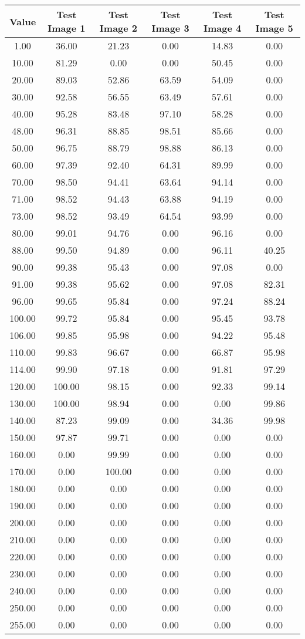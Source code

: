 \begin{tabular}{|c|c|c|c|c|c|}
\hline
\textbf{Value}&\textbf{Test Image 1}&\textbf{Test Image 2}&\textbf{Test Image 3}&\textbf{Test Image 4}&\textbf{Test Image 5}\\\hline
1.00&36.00&21.23&0.00&14.83&0.00\\\hline
10.00&81.29&0.00&0.00&50.45&0.00\\\hline
20.00&89.03&52.86&63.59&54.09&0.00\\\hline
30.00&92.58&56.55&63.49&57.61&0.00\\\hline
40.00&95.28&83.48&97.10&58.28&0.00\\\hline
48.00&96.31&88.85&98.51&85.66&0.00\\\hline
50.00&96.75&88.79&98.88&86.13&0.00\\\hline
60.00&97.39&92.40&64.31&89.99&0.00\\\hline
70.00&98.50&94.41&63.64&94.14&0.00\\\hline
71.00&98.52&94.43&63.88&94.19&0.00\\\hline
73.00&98.52&93.49&64.54&93.99&0.00\\\hline
80.00&99.01&94.76&0.00&96.16&0.00\\\hline
88.00&99.50&94.89&0.00&96.11&40.25\\\hline
90.00&99.38&95.43&0.00&97.08&0.00\\\hline
91.00&99.38&95.62&0.00&97.08&82.31\\\hline
96.00&99.65&95.84&0.00&97.24&88.24\\\hline
100.00&99.72&95.84&0.00&95.45&93.78\\\hline
106.00&99.85&95.98&0.00&94.22&95.48\\\hline
110.00&99.83&96.67&0.00&66.87&95.98\\\hline
114.00&99.90&97.18&0.00&91.81&97.29\\\hline
120.00&100.00&98.15&0.00&92.33&99.14\\\hline
130.00&100.00&98.94&0.00&0.00&99.86\\\hline
140.00&87.23&99.09&0.00&34.36&99.98\\\hline
150.00&97.87&99.71&0.00&0.00&0.00\\\hline
160.00&0.00&99.99&0.00&0.00&0.00\\\hline
170.00&0.00&100.00&0.00&0.00&0.00\\\hline
180.00&0.00&0.00&0.00&0.00&0.00\\\hline
190.00&0.00&0.00&0.00&0.00&0.00\\\hline
200.00&0.00&0.00&0.00&0.00&0.00\\\hline
210.00&0.00&0.00&0.00&0.00&0.00\\\hline
220.00&0.00&0.00&0.00&0.00&0.00\\\hline
230.00&0.00&0.00&0.00&0.00&0.00\\\hline
240.00&0.00&0.00&0.00&0.00&0.00\\\hline
250.00&0.00&0.00&0.00&0.00&0.00\\\hline
255.00&0.00&0.00&0.00&0.00&0.00\\\hline
\end{tabular}

